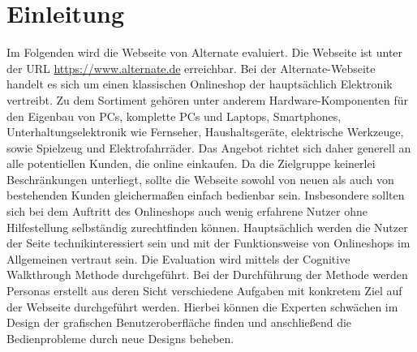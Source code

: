 \documentclass[	12pt, 
				a4paper, 
				BCOR=10mm, %
				DIV=12, 
				parskip=half, %
				headings=small, %
				twoside, %
				ngerman,
				bibliography=totoc,index=totoc, listof=totoc,
				numbers=noendperiod
				]{scrbook} %
\theoremstyle{plain}%
\theoremstyle{definition}
\theoremstyle{remark}
\begin{document}

\mainmatter %

\chapter{Einleitung}
Im Folgenden wird die Webseite von Alternate evaluiert. Die Webseite ist unter der URL \url{https://www.alternate.de} erreichbar. Bei der Alternate-Webseite handelt es sich um einen klassischen Onlineshop der hauptsächlich Elektronik vertreibt. Zu dem Sortiment gehören unter anderem Hardware-Komponenten für den Eigenbau von PCs, komplette PCs und Laptops, Smartphones, Unterhaltungselektronik wie Fernseher, Haushaltsgeräte, elektrische Werkzeuge, sowie Spielzeug und Elektrofahrräder. Das Angebot richtet sich daher generell an alle potentiellen Kunden, die online einkaufen. Da die Zielgruppe keinerlei Beschränkungen unterliegt, sollte die Webseite sowohl von neuen als auch von bestehenden Kunden gleichermaßen einfach bedienbar sein. Insbesondere sollten sich bei dem Auftritt des Onlineshops auch wenig erfahrene Nutzer ohne Hilfestellung selbständig zurechtfinden können. Hauptsächlich werden die Nutzer der Seite technikinteressiert sein und mit der Funktionsweise von Onlineshops im Allgemeinen vertraut sein.
Die Evaluation wird mittels der Cognitive Walkthrough Methode durchgeführt. Bei der Durchführung der Methode werden Personas erstellt aus deren Sicht verschiedene Aufgaben mit konkretem Ziel auf der Webseite durchgeführt werden. Hierbei können die Experten schwächen im Design der grafischen Benutzeroberfläche finden und anschließend die Bedienprobleme durch neue Designs beheben.
\end{document}
